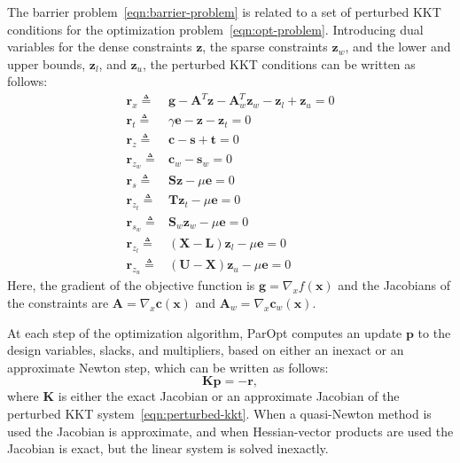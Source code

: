 \documentclass[12pt]{article}
\newcommand{\mb}{\mathbf}
\begin{document}
The barrier problem~\eqref{eqn:barrier-problem} is related to a set of perturbed KKT conditions for the optimization problem~\eqref{eqn:opt-problem}.
Introducing dual variables for the dense constraints $\mb{z}$, the sparse constraints $\mb{z}_{w}$, and the lower and upper bounds, $\mb{z}_{l}$, and $\mb{z}_{u}$, the perturbed KKT conditions can be written as follows:
%
\begin{equation}
  \label{eqn:perturbed-kkt}
  \begin{aligned}
    \mb{r}_{x} \triangleq    & \mb{g} - \mb{A}^{T}\mb{z} - \mb{A}^{T}_{w} \mb{z}_{w} - \mb{z}_{l} + \mb{z}_{u} = 0 \\
    \mb{r}_{t} \triangleq    & \gamma \mb{e} - \mb{z} - \mb{z}_{t} = 0 \\
    \mb{r}_{z} \triangleq    & \mb{c} - \mb{s} + \mb{t} = 0 \\
    \mb{r}_{z_{w}} \triangleq & \mb{c}_{w} - \mb{s}_{w} = 0 \\
    \mb{r}_{s} \triangleq    & \mb{S} \mb{z} - \mu \mb{e} = 0 \\
    \mb{r}_{z_{t}} \triangleq & \mb{T}\mb{z}_{t} - \mu \mb{e} = 0 \\
    \mb{r}_{s_{w}} \triangleq & \mb{S}_{w} \mb{z}_{w} - \mu \mb{e} = 0 \\
    \mb{r}_{z_{l}} \triangleq & (\mb{X} - \mb{L})\mb{z}_{l} - \mu \mb{e} = 0 \\
    \mb{r}_{z_{u}} \triangleq & (\mb{U} - \mb{X})\mb{z}_{u} - \mu \mb{e} = 0
  \end{aligned}
\end{equation}
Here, the gradient of the objective function is $\mb{g} = \nabla_{x} f(\mb{x})$ and the Jacobians of the constraints are $\mb{A} = \nabla_{x} \mb{c}(\mb{x})$ and $\mb{A}_{w} = \nabla_{x} \mb{c}_{w}(\mb{x})$.

At each step of the optimization algorithm, ParOpt computes an update $\mb{p}$ to the design variables, slacks, and multipliers, based on either an inexact or an approximate Newton step, which can be written as follows:
%
\begin{equation*}
  \mb{K} \mb{p} = - \mb{r},
\end{equation*}
where $\mb{K}$ is either the exact Jacobian or an approximate Jacobian of the perturbed KKT system~\eqref{eqn:perturbed-kkt}.
When a quasi-Newton method is used the Jacobian is approximate, and when Hessian-vector products are used the Jacobian is exact, but the linear system is solved inexactly.
\end{document}
